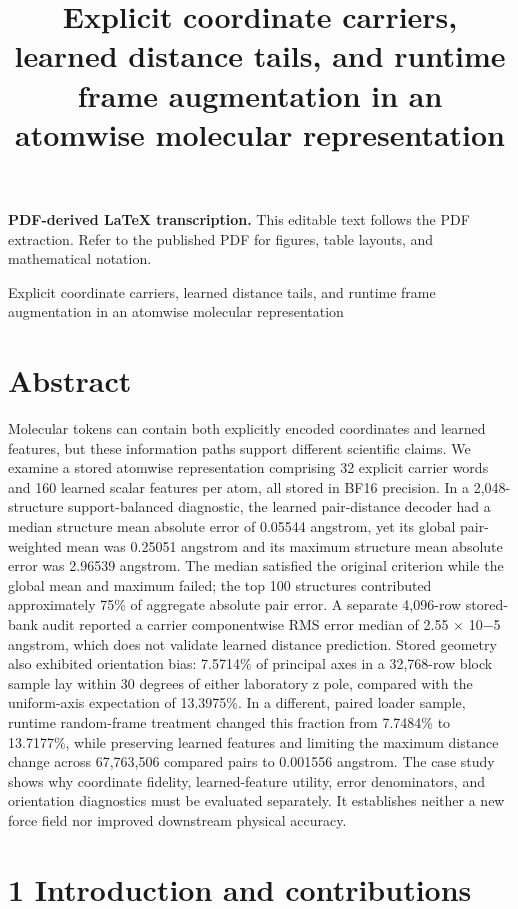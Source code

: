 \documentclass[11pt]{article}
\title{Explicit coordinate carriers, learned distance tails, and runtime frame augmentation in an atomwise molecular representation}
\author{}
\date{}
\begin{document}
\maketitle
\noindent\textbf{PDF-derived LaTeX transcription.} This editable text follows the PDF extraction. Refer to the published PDF for figures, table layouts, and mathematical notation.


Explicit coordinate carriers, learned distance tails, and runtime
frame augmentation in an atomwise molecular representation

\section*{Abstract}

Molecular tokens can contain both explicitly encoded coordinates and learned features, but
these information paths support different scientific claims. We examine a stored atomwise
representation comprising 32 explicit carrier words and 160 learned scalar features per atom,
all stored in BF16 precision. In a 2,048-structure support-balanced diagnostic, the learned
pair-distance decoder had a median structure mean absolute error of 0.05544 angstrom, yet its
global pair-weighted mean was 0.25051 angstrom and its maximum structure mean absolute error
was 2.96539 angstrom. The median satisfied the original criterion while the global mean and
maximum failed; the top 100 structures contributed approximately 75\% of aggregate absolute
pair error. A separate 4,096-row stored-bank audit reported a carrier componentwise RMS error
median of 2.55 \ensuremath{\times} 10\ensuremath{-}5 angstrom, which does not validate learned distance prediction. Stored
geometry also exhibited orientation bias: 7.5714\% of principal axes in a 32,768-row block sample
lay within 30 degrees of either laboratory z pole, compared with the uniform-axis expectation of
13.3975\%. In a different, paired loader sample, runtime random-frame treatment changed this
fraction from 7.7484\% to 13.7177\%, while preserving learned features and limiting the maximum
distance change across 67,763,506 compared pairs to 0.001556 angstrom. The case study shows
why coordinate fidelity, learned-feature utility, error denominators, and orientation diagnostics
must be evaluated separately. It establishes neither a new force field nor improved downstream
physical accuracy.

\section*{1 Introduction and contributions}
\end{document}
